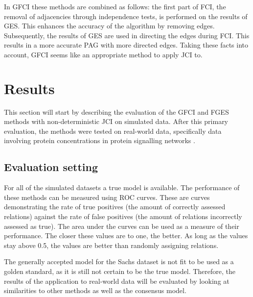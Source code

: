 \documentclass[a4paper,pdf]{article}
\begin{document}
In GFCI these methods are combined as follows: the first part of FCI, the removal of adjacencies through independence tests, is performed on the results of GES. This enhances the accuracy of the algorithm by removing edges. Subsequently, the results of GES are used in directing the edges during FCI. This results in a more accurate PAG with more directed edges. Taking these facts into account, GFCI seems like an appropriate method to apply JCI to.



\section{Results}
This section will start by describing the evaluation of the GFCI and FGES methods with non-deterministic JCI on simulated data. After this primary evaluation, the methods were tested on real-world data, specifically data involving protein concentrations in protein signalling networks \cite{sachs2005causal}.

\subsection{Evaluation setting}
For all of the simulated datasets a true model is available. The performance of these methods can be measured using ROC curves. These are curves demonstrating the rate of true positives (the amount of correctly assessed relations) against the rate of false positives (the amount of relations incorrectly assessed as true). The area under the curves can be used as a measure of their performance. The closer these values are to one, the better. As long as the values stay above 0.5, the values are better than randomly assigning relations.  

The generally accepted model for the Sachs dataset is not fit to be used as a golden standard, as it is still not certain to be the true model. Therefore, the results of the application to real-world data will be evaluated by looking at similarities to other methods as well as the consensus model. 
\end{document}
